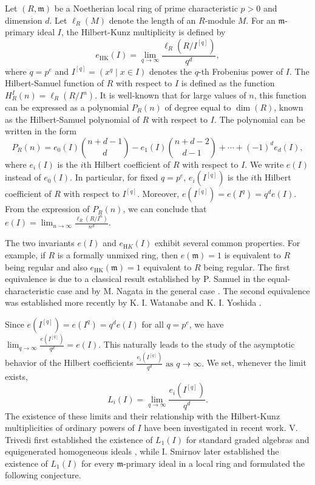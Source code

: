 \documentclass[11pt, reqno]{amsart}
\theoremstyle{plain}
\newcommand{\m}{\mathfrak{m}}
\theoremstyle{plain}
\begin{document}
Let $(R,\mathfrak{m})$ be a Noetherian local ring of prime characteristic $p>0$ and dimension $d$. Let $\ell_R(M)$ denote the length of an $R$-module $M.$ For an $\mathfrak{m}$-primary ideal $I$, the Hilbert-Kunz multiplicity is defined by
$$e_{\mathrm{HK}}(I)=\lim_{q\to\infty}\frac{\ell_R(R/I^{[q]})}{q^d},$$
where $q=p^e$ and $I^{[q]}=(x^q\mid x\in I)$
denotes the $q$-th Frobenius power of $I$. The Hilbert-Samuel function of $R$ with respect to $I$ is defined as the function $H^I_R(n)= \ell_R(R/I^{n})$. It is well-known that for large values of $n$, this function can be expressed as a polynomial $P_R(n)$ of degree equal to $\dim(R)$, known as the Hilbert-Samuel polynomial of $R$  with respect to $I$. The polynomial can be written in the form $$P_R(n)=e_0(I)\binom{n+d-1}{d}-e_1(I)\binom{n+d-2}{d-1}+\cdots+(-1)^d e_d(I),$$ where $e_i(I)$ is the $i$th Hilbert coefficient of $R$ with respect to $I$. We write $e(I)$ instead of $e_0(I)$. In particular, for fixed $q=p^e$, $e_i(I^{[q]})$ is the $i$th Hilbert coefficient of $R$ with respect to $I^{[q]}$. Moreover, $e(I^{[q]})=e(I^q)=q^d e(I).$ From the expression of $P_R(n)$, we can conclude that $\displaystyle e(I)=\lim_{n\to\infty}\frac{\ell_R(R/I^{n})}{n^d}.$ 


The two invariants $e(I)$ and $e_{\mathrm HK}(I)$ exhibit several common properties. For example, if $R$ is a formally unmixed ring, then $e(\mathfrak m)=1$ is equivalent to $R$ being regular and also $e_{\mathrm{HK}}(\mathfrak m)=1$ equivalent to $R$ being regular. The first equivalence %
is due to a classical result established by P. Samuel in the equal-characteristic case \cite{samuel} and by M. Nagata in the general case \cite{nagata}. The second equivalence %
was established more recently by K. I. Watanabe and K. I. Yoshida \cite[Theorem 1.5]{yoshida}.


Since $e(I^{[q]})=e(I^q)=q^d e(I)$ for all $q=p^e$, we have $\displaystyle \lim_{q\to\infty} \frac{e(I^{[q]})}{q^d}=e(I).$  This naturally leads to the study of the asymptotic behavior of the Hilbert coefficients $\displaystyle \frac{e_i(I^{[q]})}{q^d}
\text{ as }q\to\infty.$ 
We set, whenever the limit exists, 
$$L_i(I) =\lim_{q\to\infty}\frac{e_i(I^{[q]})}{q^d}.$$
The existence of these limits and their relationship with the Hilbert-Kunz multiplicities of ordinary powers of $I$ have been investigated in recent work. V. Trivedi first established the existence of $L_1(I)$ for standard graded algebras and equigenerated homogeneous ideals \cite{trivedi}, while I. Smirnov later established the existence of $L_1(I)$ for every $\m$-primary ideal in a local ring \cite{smirnov} and formulated the following conjecture.
\end{document}
